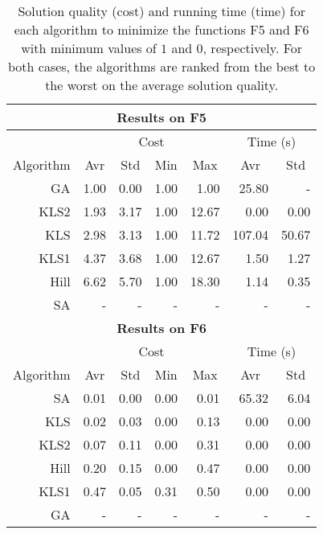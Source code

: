 \documentclass{article}
\begin{document}
\begin{table}[ht]
\centering
\begin{tabular}{r|rrrr|rr}
\hline
\multicolumn{7}{c}{{\bf Results on F5}}\\
\hline\hline
\multicolumn{1}{c}{} &
\multicolumn{4}{|c|}{Cost} &
\multicolumn{2}{c}{Time (s)}\\
\multicolumn{1}{c|}{Algorithm}
& \multicolumn{1}{c}{Avr}
& \multicolumn{1}{c}{Std}
& \multicolumn{1}{c}{Min}
& \multicolumn{1}{c}{Max}
& \multicolumn{1}{|c}{Avr}
& \multicolumn{1}{c}{Std} \\
\hline
GA   & 1.00 & 0.00 & 1.00 &  1.00 &  25.80 & -    \\
KLS2 & 1.93 & 3.17 & 1.00 & 12.67 &   0.00 &  0.00\\
KLS  & 2.98 & 3.13 & 1.00 & 11.72 & 107.04 & 50.67\\
KLS1 & 4.37 & 3.68 & 1.00 & 12.67 &   1.50 &  1.27\\
Hill & 6.62 & 5.70 & 1.00 & 18.30 &   1.14 &  0.35\\
SA   & -    & -    & -    & -     & -      & -    \\
\hline

\multicolumn{7}{c}{{\bf Results on F6}}\\
\hline\hline
\multicolumn{1}{c}{} &
\multicolumn{4}{|c|}{Cost} &
\multicolumn{2}{c}{Time (s)}\\
\multicolumn{1}{c|}{Algorithm}
& \multicolumn{1}{c}{Avr}
& \multicolumn{1}{c}{Std}
& \multicolumn{1}{c}{Min}
& \multicolumn{1}{c}{Max}
& \multicolumn{1}{|c}{Avr}
& \multicolumn{1}{c}{Std} \\
\hline
SA   & 0.01 & 0.00 & 0.00 & 0.01 & 65.32 & 6.04\\
KLS  & 0.02 & 0.03 & 0.00 & 0.13 &  0.00 & 0.00\\
KLS2 & 0.07 & 0.11 & 0.00 & 0.31 &  0.00 & 0.00\\
Hill & 0.20 & 0.15 & 0.00 & 0.47 &  0.00 & 0.00\\
KLS1 & 0.47 & 0.05 & 0.31 & 0.50 &  0.00 & 0.00\\
GA   & -    & -    & -    & -    & -     & -   \\
\hline

\end{tabular}
\caption{Solution quality (cost) and running time (time) for each
  algorithm to minimize the functions F5 and F6 with minimum values of
  $1$ and $0$, respectively. For both cases, the algorithms are ranked
  from the best to the worst on the average solution quality.}
\label{tab:f5f6}
\end{table}
\end{document}
